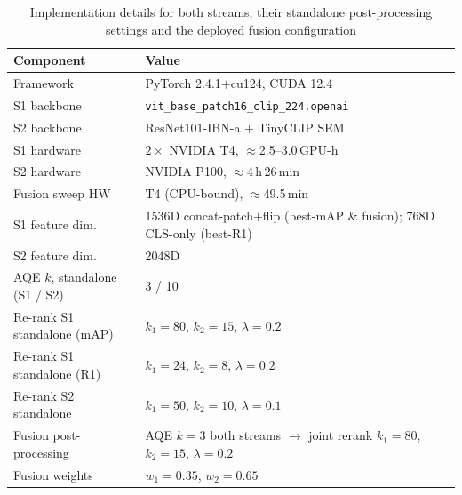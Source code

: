 \documentclass[10pt,a4paper]{article}
\begin{document}
\begin{table}[!t]
  \centering
  \caption{Implementation details for both streams, their standalone
  post-processing settings and the deployed fusion configuration}
  \label{tab:implementation}
  \small
  \begin{tabular}{L{5.4cm}L{8.4cm}}
    \toprule
    Component & Value \\
    \midrule
    Framework            & PyTorch 2.4.1$+$cu124, CUDA 12.4 \\
    S1 backbone          & \texttt{vit\_base\_\allowbreak patch16\_\allowbreak clip\_\allowbreak 224.openai} \\
    S2 backbone          & ResNet101-IBN-a $+$ TinyCLIP SEM \\
    S1 hardware          & $2\times$ NVIDIA T4, $\approx$2.5--3.0\,GPU-h \\
    S2 hardware          & NVIDIA P100, $\approx$4\,h\,26\,min \\
    Fusion sweep HW      & T4 (CPU-bound), $\approx$49.5\,min \\
    S1 feature dim.      & 1536D concat-patch$+$flip (best-mAP \& fusion);
                           768D CLS-only (best-R1) \\
    S2 feature dim.      & 2048D \\
    AQE $k$, standalone (S1 / S2) & 3 / 10 \\
    Re-rank S1 standalone (mAP)   & $k_1{=}80$, $k_2{=}15$, $\lambda{=}0.2$ \\
    Re-rank S1 standalone (R1)    & $k_1{=}24$, $k_2{=}8$, $\lambda{=}0.2$ \\
    Re-rank S2 standalone         & $k_1{=}50$, $k_2{=}10$, $\lambda{=}0.1$ \\
    Fusion post-processing        & AQE $k{=}3$ both streams $\to$ joint
                                    rerank $k_1{=}80$, $k_2{=}15$,
                                    $\lambda{=}0.2$ \\
    Fusion weights                & $w_1{=}0.35$, $w_2{=}0.65$ \\
    \bottomrule
  \end{tabular}
\end{table}
\end{document}
